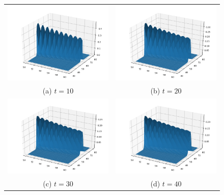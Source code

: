 \documentclass[10pt]{article}
\begin{document}
\begin{figure}[]
	\centering
	\begin{tabular}{|c|c|}
		\hline
		{\includegraphics[width=.475\linewidth]{bin/q1_quadvol_t_10}} & 
		{\includegraphics[width=.475\linewidth]{bin/q1_quadvol_t_20}}\\
		{(a) $t = 10$} & {(b) $t = 20$} \\
		\hline
		{\includegraphics[width=.475\linewidth]{bin/q1_quadvol_t_30}} &
		{\includegraphics[width=.475\linewidth]{bin/q1_quadvol_t_40}} \\
		{(c) $t = 30$} & {(d) $t = 40$} \\
		\hline
	\end{tabular}
	\label{fig:quad_vol}
\end{figure}
\end{document}
